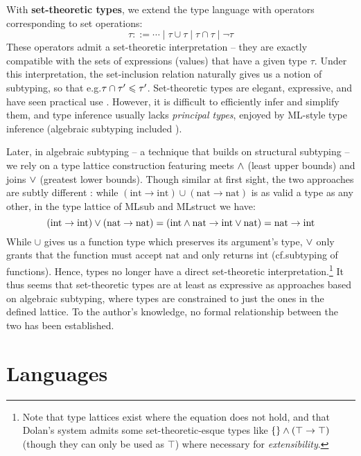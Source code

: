 With \textbf{set-theoretic types}, we extend the type language with operators corresponding to set operations:
$$ \tau ::= \cdots \mid \tau \cup \tau \mid \tau \cap \tau \mid \lnot \tau $$
These operators admit a set-theoretic interpretation -- they are exactly compatible with the sets of expressions (values) that have a given type $\tau$. 
Under this interpretation, the set-inclusion relation naturally gives us a notion of subtyping, so that e.g.\@ $\tau \cap \tau' \leqslant \tau'$.
Set-theoretic types are elegant, expressive, and have seen practical use \cite{set-theoretic-types-for-elixir, set-theoretic-types-for-erlang}. However, it is difficult to efficiently infer and simplify them, and type inference usually lacks \emph{principal types}, enjoyed by ML-style type inference (algebraic subtyping included \cite{mlstruct, castagna-dynamic}). 

Later, in algebraic subtyping -- a technique that builds on structural subtyping -- we rely on a type lattice construction featuring meets $\land$ (least upper bounds) and joins $\lor$ (greatest lower bounds). Though similar at first sight, the two approaches are subtly different \cite{mlstruct}: while $(\mathrm{int} \to \mathrm{int}) \cup (\mathrm{nat} \to \mathrm{nat})$ is as valid a type as any other, in the type lattice of MLsub \cite{mlsub} and MLstruct \cite{mlstruct} we have: $$(\mathrm{int} \to \mathrm{int}) \lor (\mathrm{nat} \to \mathrm{nat}) = (\mathrm{int} \land \mathrm{nat} \to \mathrm{int} \lor \mathrm{nat}) = \mathrm{nat} \to \mathrm{int} $$
While $\cup$ gives us a function type which preserves its argument's type, $\lor$ only grants that the function must accept $\mathrm{nat}$ and only returns $\mathrm{int}$ (cf.\@ subtyping of functions).
Hence, types no longer have a direct set-theoretic interpretation.\footnote{Note that type lattices exist where the equation does not hold, and that Dolan's system admits some set-theoretic-esque types like $\{\} \land (\top \to \top)$ (though they can only be used as $\top$) where necessary for \emph{extensibility}.} It thus seems that set-theoretic types are at least as expressive as approaches based on algebraic subtyping, where types are constrained to just the ones in the defined lattice. To the author's knowledge, no formal relationship between the two has been established.

\section{Languages}
\label{sec:languages}

